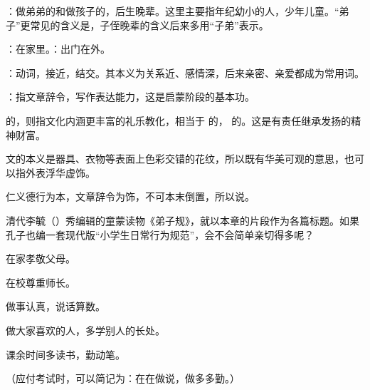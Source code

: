 {
\item {}：做弟弟的和做孩子的，后生晚辈。这里主要指年纪幼小的人，少年儿童。“弟子”更常见的含义是，子侄晚辈的含义后来多用“子弟”表示。
\item {}：在家里。：出门在外。
\item {}：动词，接近，结交。其本义为关系近、感情深，后来亲密、亲爱都成为常用词。
\item {}：指文章辞令，写作表达能力，这是启蒙阶段的基本功。

 的，则指文化内涵更丰富的礼乐教化，相当于  的， 的。这是有责任继承发扬的精神财富。

文的本义是器具、衣物等表面上色彩交错的花纹，所以既有华美可观的意思，也可以指外表浮华虚饰。

仁义德行为本，文章辞令为饰，不可本末倒置，所以说。
}
{
清代李毓（）秀编辑的童蒙读物《弟子规》，就以本章的片段作为各篇标题。如果孔子也编一套现代版“小学生日常行为规范”，会不会简单亲切得多呢？
\begin{lyenumerate}
\item 在家孝敬父母。
\item 在校尊重师长。%
\item 做事认真，说话算数。
\item 做大家喜欢的人，多学别人的长处。
\item 课余时间多读书，勤动笔。
\end{lyenumerate}
（应付考试时，可以简记为：在在做说，做多多勤。）
}


